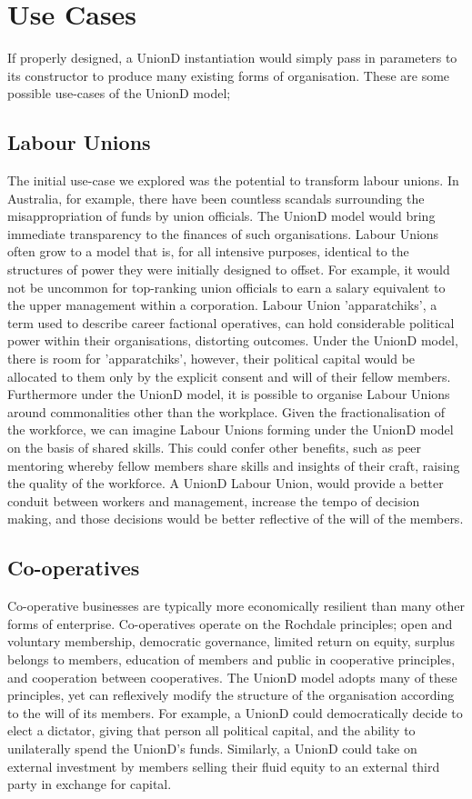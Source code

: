 \documentclass[12pt,twocolumn]{article}
\begin{document}
\section {Use Cases}

If properly designed, a UnionD instantiation would simply pass in parameters to its constructor to produce many existing forms of organisation. These are some possible use-cases of the UnionD model;

\subsection{Labour Unions}

The initial use-case we explored was the potential to transform labour unions. In Australia, for example, there have been countless scandals surrounding the misappropriation of funds by union officials. The UnionD model would bring immediate transparency to the finances of such organisations. Labour Unions often grow to a model that is, for all intensive purposes, identical to the structures of power they were initially designed to offset. For example, it would not be uncommon for top-ranking union officials to earn a salary equivalent to the upper management within a corporation. Labour Union 'apparatchiks', a term used to describe career factional operatives, can hold considerable political power within their organisations, distorting outcomes. Under the UnionD model, there is room for 'apparatchiks', however, their political capital would be allocated to them only by the explicit consent and will of their fellow members. Furthermore under the UnionD model, it is possible to organise Labour Unions around commonalities other than the workplace. Given the fractionalisation of the workforce, we can imagine Labour Unions forming under the UnionD model on the basis of shared skills. This could confer other benefits, such as peer mentoring whereby fellow members share  skills and insights of their craft, raising the quality of the workforce. A UnionD Labour Union, would provide a better conduit between workers and management, increase the tempo of decision making, and those decisions would be better reflective of the will of the members.

\subsection{Co-operatives}

Co-operative businesses are typically more economically resilient than many other forms of enterprise. Co-operatives operate on the Rochdale principles; open and voluntary membership, democratic governance, limited return on equity, surplus belongs to members, education of members and public in cooperative principles, and cooperation between cooperatives. The UnionD model adopts many of these principles, yet can reflexively modify the structure of the organisation according to the will of its members. For example, a UnionD could democratically decide to elect a dictator, giving that person all political capital, and the ability to unilaterally spend the UnionD's funds. Similarly, a UnionD could take on external investment by members selling their fluid equity to an external third party in exchange for capital.
\end{document}
